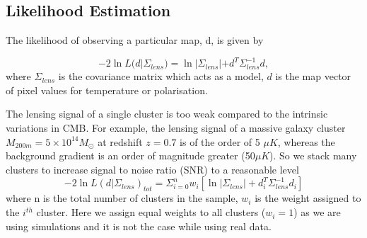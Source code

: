 \subsection*{Likelihood Estimation}
\label{lkhd_est}
  The likelihood of observing a particular map, d, is given by
  
  \begin{equation}
  -2\ln L(d|\Sigma_{lens}) = \ln |\Sigma_{lens}| + d^{T} \Sigma^{-1}_{lens} d,
  \end{equation}
 where $\Sigma_{lens}$ is the covariance matrix which acts as a model, $d$ is the map vector of pixel values for temperature or polarisation.
  
 
  The lensing signal of a single cluster is too weak compared to the intrinsic variations in CMB.  %
  For example, the lensing signal of a massive galaxy cluster $M_{200m} = 5 \times 10^{14} M_{\odot}$ at redshift $z = 0.7$ is of the order of 5 $\mu K$, whereas the background gradient is an order of magnitude greater (50$\mu K$).
So we stack many clusters to increase signal to noise ratio (SNR) to a reasonable level
  \begin{equation}
  -2\ln L(d| \Sigma_{lens})_{tot} = \Sigma^{n}_{i =0} w_{i} [\ln |\Sigma_{lens}| + d^{T}_{i} \Sigma^{-1}_{lens}  d_{i}]
  \end{equation}
  where n is the total number of clusters in the sample, $w_{i}$ is the weight assigned to the $i^{th}$ cluster.
  Here we assign equal weights to all clusters ($w_{i} = 1$) as we are using simulations and it is not the case while using real data. %

